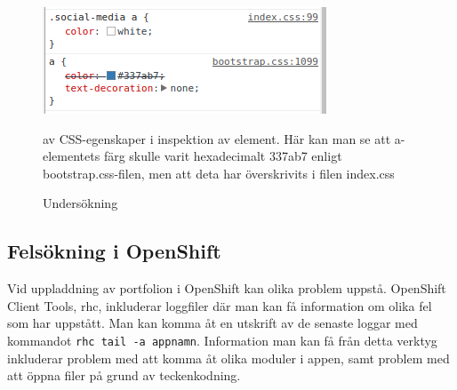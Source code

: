 \documentclass{TDP003mall}
\begin{document}
\begin{figure}
  \centering
  \includegraphics{inspectelement}
  \caption{Undersökning} av CSS-egenskaper i inspektion av element. Här kan man se att a-elementets färg skulle varit hexadecimalt 337ab7 enligt bootstrap.css-filen, men att deta har överskrivits i filen index.css
\end{figure}


\subsection{Felsökning i OpenShift}
Vid uppladdning av portfolion i OpenShift kan olika problem uppstå. OpenShift Client Tools, rhc, inkluderar loggfiler där man kan få information om olika fel som har uppstått. Man kan komma åt en utskrift av de senaste loggar med kommandot \texttt{rhc tail -a appnamn}. Information man kan få från detta verktyg inkluderar problem med att komma åt olika moduler i appen, samt problem med att öppna filer på grund av teckenkodning.





\pagebreak



\end{document}
